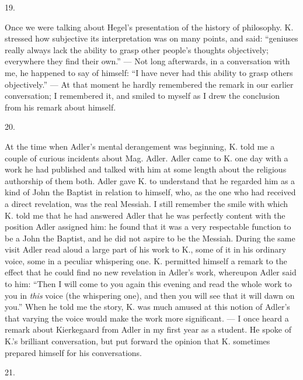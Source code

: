 \documentclass[12pt,a4paper,openany]{book}
\newcommand{\secnum}[1]{\par\begin{center}#1\end{center}\par\nobreak}
\newcommand{\opage}[1]{\marginnote{\footnotesize\textit{[#1]}}}
\begin{document}
\secnum{19.}

Once we were talking about Hegel's presentation of the history of
philosophy. K. stressed how subjective its interpretation was on many
points, and said: ``geniuses really always lack the ability to grasp other
people's thoughts objectively; everywhere they find their own.'' --- Not
long afterwards, in a conversation with me, he happened to say of himself:
``I have never had this ability to grasp others objectively.'' --- At that
moment he hardly remembered the remark in our earlier conversation; I
remembered it, and smiled to myself as I drew the conclusion from his
remark about himself.

\secnum{20.}

At the time when Adler's mental derangement was beginning, K. told me a
couple of curious incidents about Mag. Adler. Adler came to K. one day
with a work he had published and talked with him at some length about the
religious authorship of them both. Adler gave K. to understand that he
regarded him as a kind of John the Baptist in relation to himself, who, as
the one who had received a direct revelation, was the real Messiah. I
still remember the smile with which K. told me that he had answered Adler
that he was perfectly content with the position Adler assigned him: he
found that it was a very respectable function to be a John the Baptist,
and he did not aspire to be the Messiah. During the same visit Adler read
aloud a large part of his work to K., some of it in his ordinary voice,
some in a peculiar whispering one. K. permitted himself a remark to the
effect that he could find no new
\opage{352}revelation in Adler's
work, whereupon Adler said to him: ``Then I will come to you again this
evening and read the whole work to you in \emph{this} voice (the
whispering one), and then you will see that it will dawn on you.'' When he
told me the story, K. was much amused at this notion of Adler's that
varying the voice would make the work more significant. --- I once heard a
remark about Kierkegaard from Adler in my first year as a student. He
spoke of K.'s brilliant conversation, but put forward the opinion that K.
sometimes prepared himself for his conversations.

\secnum{21.}
\end{document}
